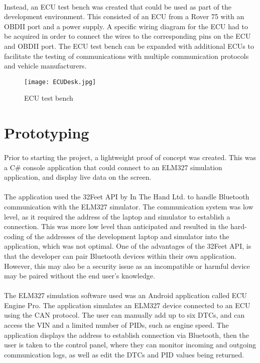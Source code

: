 	\paragraph{}{
	Instead, an ECU test bench was created that could be used as part of the development environment. This consisted of an ECU from a Rover 75 with an OBDII port and a power supply. A specific wiring diagram for the ECU had to be acquired in order to connect the wires to the corresponding pins on the ECU and OBDII port. The ECU test bench can be expanded with additional ECUs to facilitate the testing of communications with multiple communication protocols and vehicle manufacturers.
	}
	\begin{figure}[h]
		\begin{center}										
				\texttt{[image: ECUDesk.jpg]}
				\caption{ECU test bench}
		\end{center}
	\end{figure}

\section{Prototyping}
	\paragraph{}{
	Prior to starting the project, a lightweight proof of concept was created. This was a C{\#} console application that could connect to an ELM327 simulation application, and display live data on the screen. 
	}
	\paragraph{}{ %
	The application used the 32Feet API by In The Hand Ltd. to handle Bluetooth communication with the ELM327 simulator. The communication system was low level, as it required the address of the laptop and simulator to establish a connection. This was more low level than anticipated and resulted in the hard-coding of the addresses of the development laptop and simulator into the application, which was not optimal. One of the advantages of the 32Feet API, is that the developer can pair Bluetooth devices within their own application. However, this may also be a security issue as an incompatible or harmful device may be paired without the end user's knowledge.
	}
	\paragraph{}{
	The ELM327 simulation software used was an Android application called ECU Engine Pro. The application simulates an ELM327 device connected to an ECU using the CAN protocol. The user can manually add up to six DTCs, and can access the VIN and a limited number of PIDs, such as engine speed. The application displays the address to establish connection via Bluetooth, then the user is taken to the control panel, where they can monitor incoming and outgoing communication logs, as well as edit the DTCs and PID values being returned.
	}
